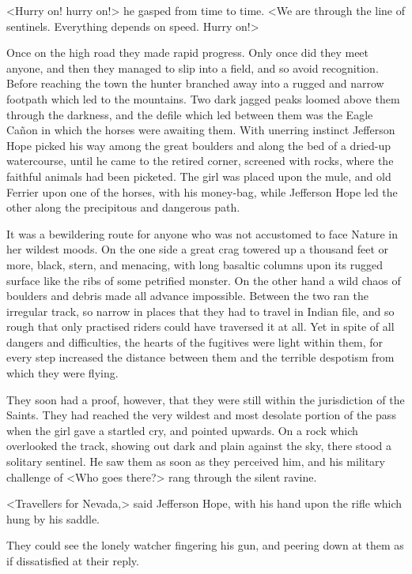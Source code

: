 <Hurry on! hurry on!> he gasped from time to time. <We are through the line of sentinels. Everything depends on speed. Hurry on!>

Once on the high road they made rapid progress. Only once did they meet anyone, and then they managed to slip into a field, and so avoid recognition. Before reaching the town the hunter branched away into a rugged and narrow footpath which led to the mountains. Two dark jagged peaks loomed above them through the darkness, and the defile which led between them was the Eagle Cañon in which the horses were awaiting them. With unerring instinct Jefferson Hope picked his way among the great boulders and along the bed of a dried-up watercourse, until he came to the retired corner, screened with rocks, where the faithful animals had been picketed. The girl was placed upon the mule, and old Ferrier upon one of the horses, with his money-bag, while Jefferson Hope led the other along the precipitous and dangerous path.

It was a bewildering route for anyone who was not accustomed to face Nature in her wildest moods. On the one side a great crag towered up a thousand feet or more, black, stern, and menacing, with long basaltic columns upon its rugged surface like the ribs of some petrified monster. On the other hand a wild chaos of boulders and debris made all advance impossible. Between the two ran the irregular track, so narrow in places that they had to travel in Indian file, and so rough that only practised riders could have traversed it at all. Yet in spite of all dangers and difficulties, the hearts of the fugitives were light within them, for every step increased the distance between them and the terrible despotism from which they were flying.

They soon had a proof, however, that they were still within the jurisdiction of the Saints. They had reached the very wildest and most desolate portion of the pass when the girl gave a startled cry, and pointed upwards. On a rock which overlooked the track, showing out dark and plain against the sky, there stood a solitary sentinel. He saw them as soon as they perceived him, and his military challenge of <Who goes there?> rang through the silent ravine.

<Travellers for Nevada,> said Jefferson Hope, with his hand upon the rifle which hung by his saddle.

They could see the lonely watcher fingering his gun, and peering down at them as if dissatisfied at their reply.

